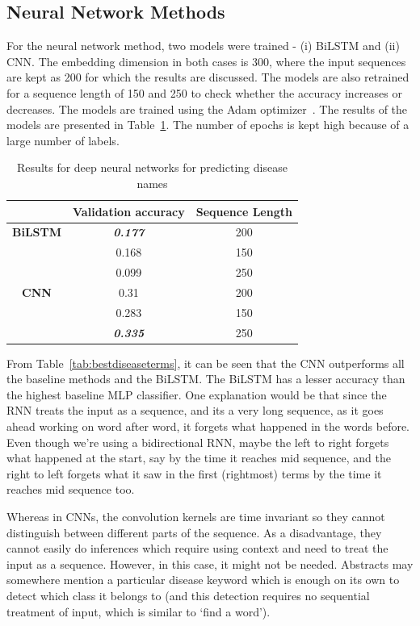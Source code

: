 \subsection{Neural Network Methods}
For the neural network method, two models were trained - (i) BiLSTM and (ii) CNN. The embedding dimension in both cases is 300, where the input sequences are kept as 200 for which the results are discussed. The models are also retrained for a sequence length of 150 and 250 to check whether the accuracy increases or decreases. The models are trained using the Adam optimizer~\cite{kingma2014adam}. 
The results of the models are presented in Table~\ref{tab:DLdiseases}. The number of epochs is kept high because of a large number of labels. 

\begin{table}[!htb]
\centering
\begin{tabular}{|c|c|c|}
\hline
 & Validation accuracy & Sequence Length \\ \hline
\textbf{BiLSTM} & \textit{\textbf{0.177}} & 200 \\ \hline
 & 0.168 & 150 \\ \hline
 & 0.099 & 250 \\ \hline
\textbf{CNN} & 0.31 & 200 \\ \hline
 & 0.283 & 150 \\ \hline
 & \textit{\textbf{0.335}} & 250 \\ \hline
\end{tabular}
\caption{Results for deep neural networks for predicting disease names}
\label{tab:DLdiseases}
\end{table}

From Table~\ref{tab:bestdiseaseterms}, it can be seen that the CNN outperforms all the baseline methods and the BiLSTM. The BiLSTM has a lesser accuracy than the highest baseline MLP classifier. One explanation would be that since the RNN treats the input as a sequence, and its a very long sequence, as it goes ahead working on word after word, it forgets what happened in the words before. Even though we're using a bidirectional RNN, maybe the left to right forgets what happened at the start, say by the time it reaches mid sequence, and the right to left forgets what it saw in the first (rightmost) terms by the time it reaches mid sequence too. 

Whereas in CNNs, the convolution kernels are time invariant so they cannot distinguish between different parts of the sequence. As a disadvantage, they cannot easily do inferences which require using context and need to treat the input as a sequence. However, in this case, it might not be needed. Abstracts may somewhere mention a particular disease keyword which is enough on its own to detect which class it belongs to (and this detection requires no sequential treatment of input, which is similar to `find a word').

